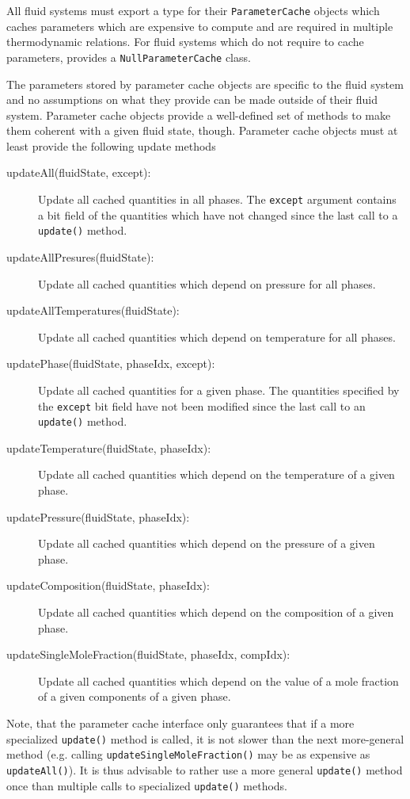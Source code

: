 All fluid systems must export a type for their \texttt{ParameterCache}
objects which caches parameters which are expensive to compute and are
required in multiple thermodynamic relations. For fluid systems which
do not require to cache parameters, \Dumux provides a
\texttt{NullParameterCache} class.

The parameters stored by parameter cache objects are specific to the
fluid system and no assumptions on what they provide can be made
outside of their fluid system. Parameter cache objects provide a
well-defined set of methods to make them coherent with a given fluid
state, though.  Parameter cache objects must at least provide the
following update methods
\begin{description}
\item[updateAll(fluidState, except):] Update all cached quantities in
  all phases. The \texttt{except} argument contains a bit field of the
  quantities which have not changed since the last call to a
  \texttt{update()} method.
  \item[updateAllPresures(fluidState):]
    Update all cached quantities which depend on pressure for
    all phases.
  \item[updateAllTemperatures(fluidState):]
    Update all cached quantities which depend on temperature for
    all phases.
  \item[updatePhase(fluidState, phaseIdx, except):] Update all cached
    quantities for a given phase. The quantities specified by the
    \texttt{except} bit field have not been modified since the last
    call to an \texttt{update()} method.
  \item[updateTemperature(fluidState, phaseIdx):] Update all cached
    quantities which depend on the temperature of a given phase.
  \item[updatePressure(fluidState, phaseIdx):] Update all cached
    quantities which depend on the pressure of a given phase.
  \item[updateComposition(fluidState, phaseIdx):] Update all cached
    quantities which depend on the composition of a given phase.
  \item[updateSingleMoleFraction(fluidState, phaseIdx, compIdx):]
    Update all cached quantities which depend on the value of a mole
    fraction of a given components of a given phase.
\end{description}
Note, that the parameter cache interface only guarantees that if a
more specialized \texttt{update()} method is called, it is not slower
than the next more-general method (e.g. calling
\texttt{updateSingleMoleFraction()} may be as expensive as
\texttt{updateAll()}). It is thus advisable to rather use a more
general \texttt{update()} method once than multiple calls to
specialized \texttt{update()} methods.

